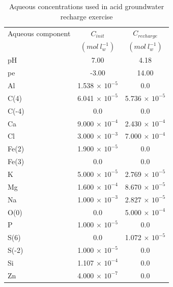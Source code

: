 \begin{table}
\caption{Aqueous concentrations used in acid groundwater recharge exercise}
\begin{center}
\begin{tabular}{l c c}
\hline
Aqueous  component        & $C_{init}$      & $C_{recharge}$      \\
                & $(mol\ l^{-1}_w)$         & $(mol\ l^{-1}_w)$      \\ \hline
pH              &   7.00                    &  4.18           \\
pe              &   -3.00                   &  14.00           \\
Al              &  1.538 $\times$ $10^{-5}$ & 0.0             \\
C(4)            &  6.041 $\times$ $10^{-5}$ & 5.736 $\times$ $10^{-5}$   \\
C(-4)           &  0.0                      &     0.0                     \\
Ca              &  9.000 $\times$ $10^{-4}$ & 2.430 $\times$ $10^{-4}$   \\
Cl              &  3.000 $\times$ $10^{-3}$ & 7.000 $\times$ $10^{-4}$   \\
Fe(2)           &  1.900 $\times$ $10^{-5}$ & 0.0                        \\
Fe(3)           &  0.0                      & 0.0                        \\
K               &  5.000 $\times$ $10^{-5}$ & 2.769 $\times$ $10^{-5}$   \\
Mg              &  1.600 $\times$ $10^{-4}$ & 8.670 $\times$ $10^{-5}$   \\
Na              &  1.000 $\times$ $10^{-3}$ & 2.827 $\times$ $10^{-5}$   \\
O(0)            &  0.0                      & 5.000 $\times$ $10^{-4}$   \\
P               &  1.000 $\times$ $10^{-5}$ &     0.0                    \\
S(6)            &  0.0                      & 1.072 $\times$ $10^{-5}$   \\
S(-2)           &  1.000 $\times$ $10^{-5}$ &     0.0                    \\
Si              &  1.107 $\times$ $10^{-4}$ &     0.0                    \\ 
Zn              &  4.000 $\times$ $10^{-7}$ &     0.0                    \\
\hline
\end{tabular}
\label{franken_caqu}
\end{center}
\end{table}




